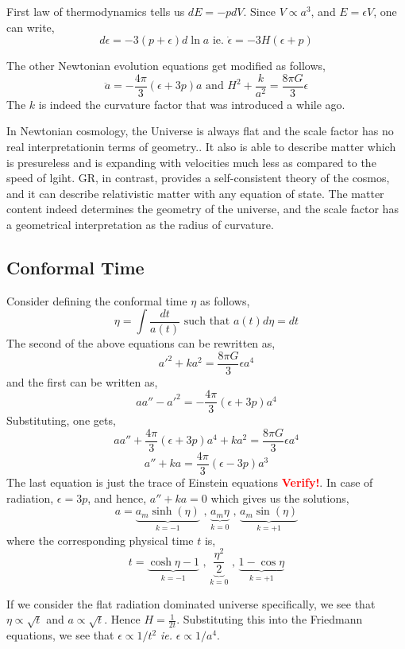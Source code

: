 \documentclass[a4paper,11pt]{article}
\begin{document}
First law of thermodynamics tells us $dE = -pdV$. Since $V \propto a^3$, and $E = \epsilon V$, one can write,
$$d \epsilon = -3 (p+\epsilon) d\ln a \text{ ie. } \dot{\epsilon} = -3H(\epsilon + p)$$

The other Newtonian evolution equations get modified as follows, 
$$\ddot{a} = -\frac{4 \pi}{3}(\epsilon + 3p)a \text{ and } H^2 + \frac{k}{a^2} = \frac{8 \pi G}{3}\epsilon$$ 
The $k$ is indeed the curvature factor that was introduced a while ago.

In Newtonian cosmology, the Universe is always flat and the scale factor has no real interpretationin terms of geometry.. It also is able to describe matter which is presureless and is expanding with velocities much less as compared to the speed of lgiht. GR, in contrast, provides a self-consistent theory of the cosmos, and it can describe relativistic matter with any equation of state. The matter content indeed determines the geometry of the universe, and the scale factor has a geometrical interpretation as the radius of curvature.

\subsection{Conformal Time}
Consider defining the conformal time $\eta$ as follows,
$$\eta = \int \frac{dt}{a(t)} \text{ such that } a(t)d\eta = dt$$
The second of the above equations can be rewritten as,
$$ a'^2 + k a^2 = \frac{8\pi G}{3}\epsilon a^4$$  and the first can be written as,
$$a a'' -a'^2 = -\frac{4 \pi}{3}(\epsilon + 3p)a^4$$
Substituting, one gets,
$$a a'' + \frac{4 \pi}{3}(\epsilon + 3p)a^4 + k a^2 = \frac{8\pi G}{3}\epsilon a^4$$
$$a'' + k a = \frac{4 \pi}{3}(\epsilon - 3p)a^3 $$
The last equation is just the trace of Einstein equations \textbf{\textcolor{red}{Verify!}}. In case of radiation, $\epsilon = 3p$, and hence, $a'' + ka = 0$ which gives us the solutions,
$$a = \underbrace{a_m \sinh(\eta)}_{k=-1} \text{ , }\underbrace{a_m \eta}_{k=0} \text{ , } \underbrace{a_m \sin(\eta)}_{k=+1} $$ where the corresponding physical time $t$ is,
$$t = \underbrace{\cosh \eta - 1}_{k=-1} \text{ , }\underbrace{\frac{\eta^2}{2}}_{k=0} \text{ , } \underbrace{1 - \cos \eta}_{k=+1} $$

If we consider the flat radiation dominated universe specifically, we see that $\eta \propto \sqrt{t}$ and $a \propto \sqrt{t}$. Hence $H = \frac{1}{2t}$. Substituting this into the Friedmann equations, we see that $\epsilon \propto 1/t^2$ \textit{ie.} $\epsilon \propto 1/a^4$.
\end{document}
